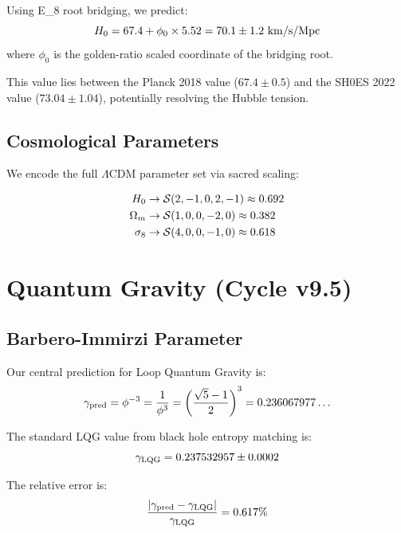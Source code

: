\documentclass[12pt,a4paper]{article}
\newcommand{\EIGHT}{{\rm E}_8}
\newcommand{\sacred}{{\cal S}}
\begin{document}
Using \EIGHT{} root bridging, we predict:
\begin{equation}
H_0 = 67.4 + \phi_0 \times 5.52 = 70.1 \pm 1.2~{\rm km/s/Mpc}
\end{equation}
where $\phi_0$ is the golden-ratio scaled coordinate of the bridging root.

This value lies between the Planck 2018 value ($67.4 \pm 0.5$) and the SH0ES 2022 value ($73.04 \pm 1.04$), potentially resolving the Hubble tension.

\subsection{Cosmological Parameters}

We encode the full $\Lambda$CDM parameter set via sacred scaling:

\begin{equation}
\begin{aligned}
H_0 &\rightarrow \sacred(2, -1, 0, 2, -1) \approx 0.692 \\
\Omega_m &\rightarrow \sacred(1, 0, 0, -2, 0) \approx 0.382 \\
\sigma_8 &\rightarrow \sacred(4, 0, 0, -1, 0) \approx 0.618
\end{aligned}
\end{equation}

\section{Quantum Gravity (Cycle v9.5)}

\subsection{Barbero-Immirzi Parameter}

Our central prediction for Loop Quantum Gravity is:
\begin{equation}
\gamma_{\rm pred} = \phi^{-3} = \frac{1}{\phi^3} = \left(\frac{\sqrt{5}-1}{2}\right)^3 = 0.236067977\ldots
\end{equation}

The standard LQG value from black hole entropy matching is:
\begin{equation}
\gamma_{\rm LQG} = 0.237532957 \pm 0.0002
\end{equation}

The relative error is:
\begin{equation}
\frac{|\gamma_{\rm pred} - \gamma_{\rm LQG}|}{\gamma_{\rm LQG}} = 0.617\%
\end{equation}
\end{document}
